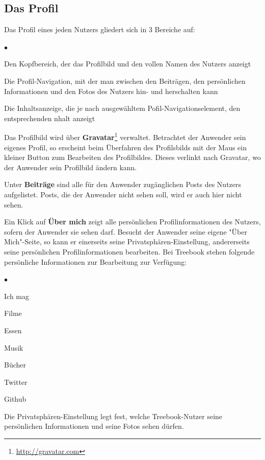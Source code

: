 \documentclass[10pt,a4paper]{book}
\begin{document}
\subsection{Das Profil}
Das Profil eines jeden Nutzers gliedert sich in 3 Bereiche auf:
\begin{list}{$\bullet$}{}
\item Den Kopfbereich, der das Profilbild und den vollen Namen des Nutzers anzeigt
\item Die Profil-Navigation, mit der man zwischen den Beiträgen, den persönlichen Informationen und den Fotos des Nutzers hin- und herschalten kann
\item Die Inhaltsanzeige, die je nach ausgewähltem Pofil-Navigationselement, den entsprechenden nhalt anzeigt
\end{list}

Das Profilbild wird über \textbf{Gravatar}\footnote{\href{http://gravatar.com}{http://gravatar.com}} verwaltet. Betrachtet der Anwender sein eigenes Profil, so erscheint beim Überfahren des Profilsbilds mit der Maus ein kleiner Button zum Bearbeiten des Profilbildes. Dieses verlinkt nach Gravatar, wo der Anwender sein Profilbild ändern kann.

Unter \textbf{Beiträge} sind alle für den Anwender zugänglichen Posts des Nutzers aufgelistet. Posts, die der Anwender nicht sehen soll, wird er auch hier nicht sehen.

Ein Klick auf \textbf{Über mich} zeigt alle persönlichen Profilinformationen des Nutzers, sofern der Anwender sie sehen darf. Besucht der Anwender seine eigene "Über Mich"-Seite, so kann er einerseits seine Privatsphären-Einstellung, andererseits seine persönlichen Profilinformationen bearbeiten.
Bei Treebook stehen folgende persönliche Informationen zur Bearbeitung zur Verfügung:
\begin{list}{$\bullet$}{}
\item Ich mag
\item Filme
\item Essen
\item Musik
\item Bücher
\item Twitter
\item Github
\end{list}
Die Privatsphären-Einstellung legt fest, welche Treebook-Nutzer seine persönlichen Informationen und seine Fotos sehen dürfen.
\end{document}
